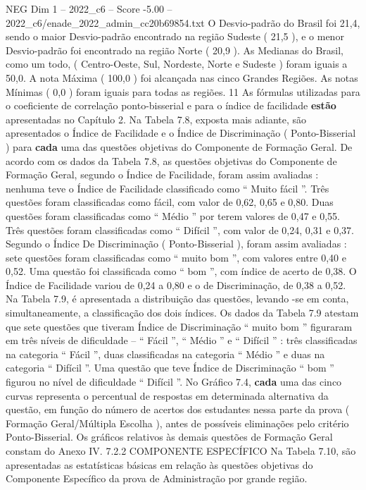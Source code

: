 \begin{textsample}{NEG Dim 1 – 2022\_c6 – Score -5.00 – 2022\_c6/enade\_2022\_admin\_cc20b69854.txt}
O Desvio-padrão do Brasil foi 21,4, sendo o maior Desvio-padrão encontrado na região Sudeste ( 21,5 ), e o menor Desvio-padrão foi encontrado na região Norte ( 20,9 ).
As Medianas do Brasil, como um todo, ( Centro-Oeste, Sul, Nordeste, Norte e Sudeste ) foram iguais a 50,0.
A nota Máxima ( 100,0 ) foi alcançada nas cinco Grandes Regiões.
As notas Mínimas ( 0,0 ) foram iguais para todas as regiões. 11 As fórmulas utilizadas para o coeficiente de correlação ponto-bisserial e para o índice de facilidade \textbf{estão} apresentadas no Capítulo 2.
Na Tabela 7.8, exposta mais adiante, são apresentados o Índice de Facilidade e o Índice de Discriminação ( Ponto-Bisserial ) para \textbf{cada} uma das questões objetivas do Componente de Formação Geral.
De acordo com os dados da Tabela 7.8, as questões objetivas do Componente de Formação Geral, segundo o Índice de Facilidade, foram assim avaliadas : nenhuma teve o Índice de Facilidade classificado como “ Muito fácil ”.
Três questões foram classificadas como fácil, com valor de 0,62, 0,65 e 0,80.
Duas questões foram classificadas como “ Médio ” por terem valores de 0,47 e 0,55.
Três questões foram classificadas como “ Difícil ”, com valor de 0,24, 0,31 e 0,37.
Segundo o Índice De Discriminação ( Ponto-Bisserial ), foram assim avaliadas : sete questões foram classificadas como “ muito bom ”, com valores entre 0,40 e 0,52.
Uma questão foi classificada como “ bom ”, com índice de acerto de 0,38.
O Índice de Facilidade variou de 0,24 a 0,80 e o de Discriminação, de 0,38 a 0,52.
Na Tabela 7.9, é apresentada a distribuição das questões, levando -se em conta, simultaneamente, a classificação dos dois índices.
Os dados da Tabela 7.9 atestam que sete questões que tiveram Índice de Discriminação “ muito bom ” figuraram em três níveis de dificuldade – “ Fácil ”, “ Médio ” e “ Difícil ” : três classificadas na categoria “ Fácil ”, duas classificadas na categoria “ Médio ” e duas na categoria “ Difícil ”.
Uma questão que teve Índice de Discriminação “ bom ” figurou no nível de dificuldade “ Difícil ”.
No Gráfico 7.4, \textbf{cada} uma das cinco curvas representa o percentual de respostas em determinada alternativa da questão, em função do número de acertos dos estudantes nessa parte da prova ( Formação Geral/Múltipla Escolha ), antes de possíveis eliminações pelo critério Ponto-Bisserial.
Os gráficos relativos às demais questões de Formação Geral constam do Anexo IV. 7.2.2 COMPONENTE ESPECÍFICO Na Tabela 7.10, são apresentadas as estatísticas básicas em relação às questões objetivas do Componente Específico da prova de Administração por grande região.

\end{textsample}
